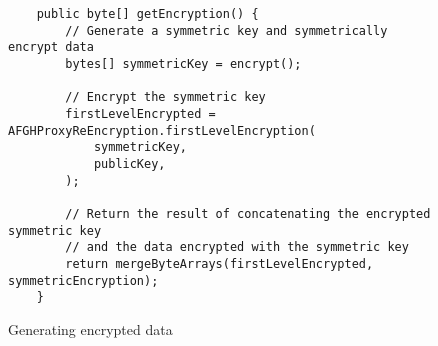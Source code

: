 \begin{figure}[H]
  \centering
  \begin{verbatim}
	public byte[] getEncryption() {
		// Generate a symmetric key and symmetrically encrypt data
		bytes[] symmetricKey = encrypt();

		// Encrypt the symmetric key
		firstLevelEncrypted = AFGHProxyReEncryption.firstLevelEncryption(
			symmetricKey,
			publicKey,
		);

		// Return the result of concatenating the encrypted symmetric key
		// and the data encrypted with the symmetric key
		return mergeByteArrays(firstLevelEncrypted, symmetricEncryption);
	}
  \end{verbatim}
  \caption{Generating encrypted data}
  \label{code:encrypt_data}
\end{figure}
